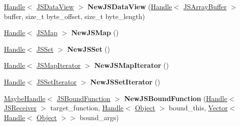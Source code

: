 \begin{DoxyCompactItemize}
\item 
\hyperlink{classv8_1_1internal_1_1_handle}{Handle}$<$ \hyperlink{classv8_1_1internal_1_1_j_s_data_view}{J\+S\+Data\+View} $>$ {\bfseries New\+J\+S\+Data\+View} (\hyperlink{classv8_1_1internal_1_1_handle}{Handle}$<$ \hyperlink{classv8_1_1internal_1_1_j_s_array_buffer}{J\+S\+Array\+Buffer} $>$ buffer, size\+\_\+t byte\+\_\+offset, size\+\_\+t byte\+\_\+length)\hypertarget{classv8_1_1internal_1_1_factory_aa5aaf8227d0f138b5382d467394ac826}{}\label{classv8_1_1internal_1_1_factory_aa5aaf8227d0f138b5382d467394ac826}

\item 
\hyperlink{classv8_1_1internal_1_1_handle}{Handle}$<$ \hyperlink{classv8_1_1internal_1_1_j_s_map}{J\+S\+Map} $>$ {\bfseries New\+J\+S\+Map} ()\hypertarget{classv8_1_1internal_1_1_factory_abb357b7bd90eade9a67402d2602a0f2f}{}\label{classv8_1_1internal_1_1_factory_abb357b7bd90eade9a67402d2602a0f2f}

\item 
\hyperlink{classv8_1_1internal_1_1_handle}{Handle}$<$ \hyperlink{classv8_1_1internal_1_1_j_s_set}{J\+S\+Set} $>$ {\bfseries New\+J\+S\+Set} ()\hypertarget{classv8_1_1internal_1_1_factory_a54d6c8706afcbb53990a0f89041c7b9c}{}\label{classv8_1_1internal_1_1_factory_a54d6c8706afcbb53990a0f89041c7b9c}

\item 
\hyperlink{classv8_1_1internal_1_1_handle}{Handle}$<$ \hyperlink{classv8_1_1internal_1_1_j_s_map_iterator}{J\+S\+Map\+Iterator} $>$ {\bfseries New\+J\+S\+Map\+Iterator} ()\hypertarget{classv8_1_1internal_1_1_factory_a7a2dca9a57e429b9eed94d24869cdc0a}{}\label{classv8_1_1internal_1_1_factory_a7a2dca9a57e429b9eed94d24869cdc0a}

\item 
\hyperlink{classv8_1_1internal_1_1_handle}{Handle}$<$ \hyperlink{classv8_1_1internal_1_1_j_s_set_iterator}{J\+S\+Set\+Iterator} $>$ {\bfseries New\+J\+S\+Set\+Iterator} ()\hypertarget{classv8_1_1internal_1_1_factory_a176482028cc0639e17fc9ad178c2bed4}{}\label{classv8_1_1internal_1_1_factory_a176482028cc0639e17fc9ad178c2bed4}

\item 
\hyperlink{classv8_1_1internal_1_1_maybe_handle}{Maybe\+Handle}$<$ \hyperlink{classv8_1_1internal_1_1_j_s_bound_function}{J\+S\+Bound\+Function} $>$ {\bfseries New\+J\+S\+Bound\+Function} (\hyperlink{classv8_1_1internal_1_1_handle}{Handle}$<$ \hyperlink{classv8_1_1internal_1_1_j_s_receiver}{J\+S\+Receiver} $>$ target\+\_\+function, \hyperlink{classv8_1_1internal_1_1_handle}{Handle}$<$ \hyperlink{classv8_1_1internal_1_1_object}{Object} $>$ bound\+\_\+this, \hyperlink{classv8_1_1internal_1_1_vector}{Vector}$<$ \hyperlink{classv8_1_1internal_1_1_handle}{Handle}$<$ \hyperlink{classv8_1_1internal_1_1_object}{Object} $>$$>$ bound\+\_\+args)\hypertarget{classv8_1_1internal_1_1_factory_a90c2b9cc28cf11209da9170ed1a072ee}{}\label{classv8_1_1internal_1_1_factory_a90c2b9cc28cf11209da9170ed1a072ee}


\end{DoxyCompactItemize}

